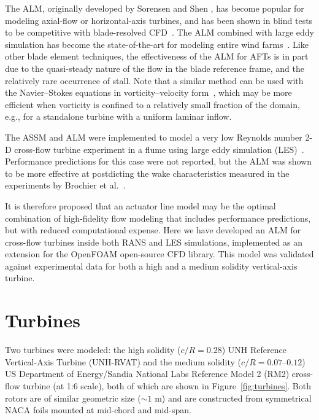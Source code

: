 \documentclass[times]{weauth}
\begin{document}
The ALM, originally developed by Sorensen and Shen \cite{Sorensen2002}, has
become popular for modeling axial-flow or horizontal-axis turbines, and has been
shown in blind tests to be competitive with blade-resolved
CFD~\cite{Krogstad2013, Pierella2014}. The ALM combined with large eddy
simulation has become the state-of-the-art for modeling entire wind
farms~\cite{Archer2013, Churchfield2012, Sorensen2015, Fleming2013,
Fleming2014}. Like other blade element techniques, the effectiveness of the ALM
for AFTs is in part due to the quasi-steady nature of the flow in the blade
reference frame, and the relatively rare occurrence of stall. Note that a
similar method can be used with the Navier--Stokes equations in
vorticity--velocity form~\cite{Scheurich2011b}, which may be more efficient when
vorticity is confined to a relatively small fraction of the domain, e.g., for a
standalone turbine with a uniform laminar inflow.

The ASSM and ALM were implemented to model a very low Reynolds number 2-D
cross-flow turbine experiment in a flume using large eddy simulation
(LES)~\cite{Shamsoddin2014}. Performance predictions for this case were not
reported, but the ALM was shown to be more effective at postdicting the wake
characteristics measured in the experiments by Brochier et
al.~\cite{Brochier1986}.

It is therefore proposed that an actuator line model may be the optimal
combination of high-fidelity flow modeling that includes performance
predictions, but with reduced computational expense. Here we have developed an
ALM for cross-flow turbines inside both RANS and LES simulations, implemented as
an extension for the OpenFOAM open-source CFD library. This model was validated
against experimental data for both a high \cite{Bachant2015-JoT} and a medium
\cite{Bachant2016-RM2-paper} solidity vertical-axis turbine.


\section{Turbines}

Two turbines were modeled: the high solidity ($c/R=0.28$) UNH Reference
Vertical-Axis Turbine (UNH-RVAT) and the medium solidity ($c/R=0.07$--$0.12$) US
Department of Energy/Sandia National Labs Reference Model 2 (RM2) cross-flow
turbine (at 1:6 scale), both of which are shown in Figure~\ref{fig:turbines}.
Both rotors are of similar geometric size ($\sim 1$ m) and are constructed from
symmetrical NACA foils mounted at mid-chord and mid-span.
\end{document}
